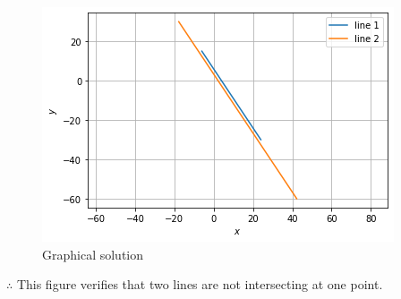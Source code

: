 \documentclass[journal,12pt,twocolumn]{IEEEtran}
\begin{document}
\begin{figure}[H]
\centering
\includegraphics[width= \columnwidth]{download4.png}
\caption{Graphical solution}
\label{Fig:Graphical Solution}
\end{figure}
$\therefore$ This figure verifies that two lines are  not intersecting at one point.
\end{document}
